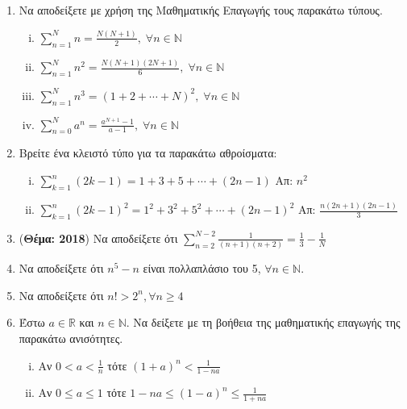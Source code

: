 \begin{enumerate}
    \item Να αποδείξετε με χρήση της Μαθηματικής Επαγωγής τους παρακάτω τύπους.
      \begin{enumerate}[i)]
        \item $ \sum_{n=1}^{N} n = \frac{N(N+1)}{2},\; \forall n \in
          \mathbb{N} $
        \item $ \sum_{n=1}^{N} n^{2} = \frac{N(N+1)(2N+1)}{6},\; \forall 
          n \in \mathbb{N} $
        \item $ \sum_{n=1}^{N} n^{3} = (1+2+\cdots + N)^{2}, \; 
          \forall n \in \mathbb{N} $
        \item $ \sum_{n=0}^{N} a^{n} = \frac{a^{N+1} - 1}{a-1},\; 
          \forall n \in \mathbb{N}$
      \end{enumerate}

    \item \label{ask:sums} Βρείτε ένα κλειστό τύπο για τα παρακάτω 
      αθροίσματα: 
      \begin{enumerate}[i)]
        \item $ \sum_{k=1}^{n} (2k-1) = 1 + 3 + 5 + \cdots + (2n-1)  
          $ \hfill Απ: $ n^{2} $ 

        \item $ \sum_{k=1}^{n} (2k-1)^{2} = 1^{2} + 3^{2} + 5^{2} + \cdots 
          + (2n-1)^{2}  $ \hfill Απ: $ \frac{n(2n+1)(2n-1)}{3} $ 
      \end{enumerate}

    \item \label{ask:thema18sum} ({\bfseries Θέμα: 2018}) Να αποδείξετε ότι 
      $ \sum_{n=2}^{N-2} \frac{1}{(n+1)(n+2)} = \frac{1}{3} - \frac{1}{N} $

    \item Να αποδείξετε ότι $ n^{5} - n $ είναι πολλαπλάσιο του 5,
      $ \forall n \in \mathbb{N} $.

    \item Να αποδείξετε ότι $ n! > 2^{n}, \forall n \geq 4 $

      \pagebreak

    \item Έστω $ a \in \mathbb{R} $ και $ n \in \mathbb{N} $. Να δείξετε
      με τη βοήθεια της μαθηματικής επαγωγής της παρακάτω ανισότητες.
      \begin{enumerate}[i)]
        \item Αν $ 0<a< \frac{1}{n} $ τότε $ (1+a)^{n} < \frac{1}{1-na} $
        \item Αν $ 0 \leq a \leq 1$  τότε $ 1-na \leq (1-a)^{n} \leq
          \frac{1}{1+na} $
      \end{enumerate}


\end{enumerate}
